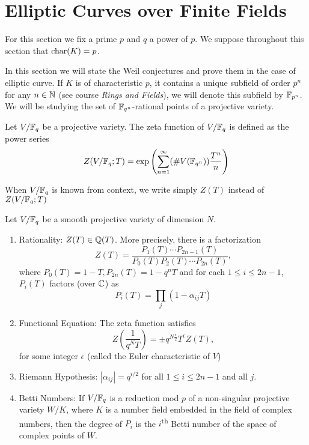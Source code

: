 \section{Elliptic Curves over Finite Fields}

For this section we fix a prime $p$ and $q$ a power of $p$.
We suppose throughout this section that $\operatorname{char}(K) = p$.

In this section we will state the Weil conjectures and prove them in the
case of elliptic curve.
If $K$ is of characteristic $p$,
it contains a unique subfield of order $p^n$ for any $n \in \mathbb{N}$ (see
course \emph{Rings and Fields}), we will denote this subfield by $\mathbb{F}_{p^n}$.
We will be studying the set of
$\mathbb{F}_{q^n}$-rational points of a projective variety.

\begin{definition}
	Let $V/\mathbb{F}_q$ be a projective variety.
	The zeta function of $V/\mathbb{F}_q$ is defined as the power series
	\begin{equation*}
		Z(V/\mathbb{F}_q; T) = \exp\left(\sum_{n=1}^\infty (\#V(\mathbb{F}_{q^n}))
		\frac{T^n}{n}\right)
	\end{equation*}
\end{definition}

\begin{notation}
	When $V/\mathbb{F}_q$ is known from context, we write simply $Z(T)$
	instead of $Z(V/\mathbb{F}_q; T)$
\end{notation}

\begin{theorem}
	\label{thm:weil}
	Let $V/\mathbb{F}_q$ be a smooth projective variety of dimension $N$.
	\begin{enumerate}[label=(\alph*)]
		\item Rationality: $Z(T) \in \mathbb{Q}(T)$. More precisely, 
			there is a factorization
			\begin{equation*}
				Z(T) = \frac{P_1(T)\cdots P_{2n-1}(T)}
				{P_0(T)P_2(T) \cdots P_{2n}(T)},
			\end{equation*}
			where $P_0(T) = 1 - T, P_{2n}(T) = 1 - q^nT$ and for each
			$1 \leq i \leq 2n - 1$, $P_i(T)$ factors (over $\mathbb{C}$) as
			\begin{equation*}
				P_i(T) = \prod_j (1 - \alpha_{ij}T)
			\end{equation*}
		\item Functional Equation: The zeta function satisfies
			\begin{equation*}
				Z\left(\frac{1}{q^NT}\right) = \pm q^{N\frac{\epsilon}{2}}
				T^{\epsilon} Z(T),
			\end{equation*}
			for some integer $\epsilon$ (called the Euler characteristic of $V$)
		\item Riemann Hypothesis: $|\alpha_{ij}| = q^{i/2}$
			for all $1 \leq i \leq 2n - 1$ and all $j$.
		\item Betti Numbers: If $V/\mathbb{F}_q$ is a reduction mod $p$ of a
			non-singular projective variety $W/K$, where $K$ is a number
			field embedded in the field of complex numbers, then the degree
			of $P_i$ is the $i$\textsuperscript{th} Betti number of the space
			of complex points of $W$. 
	\end{enumerate}
\end{theorem}


